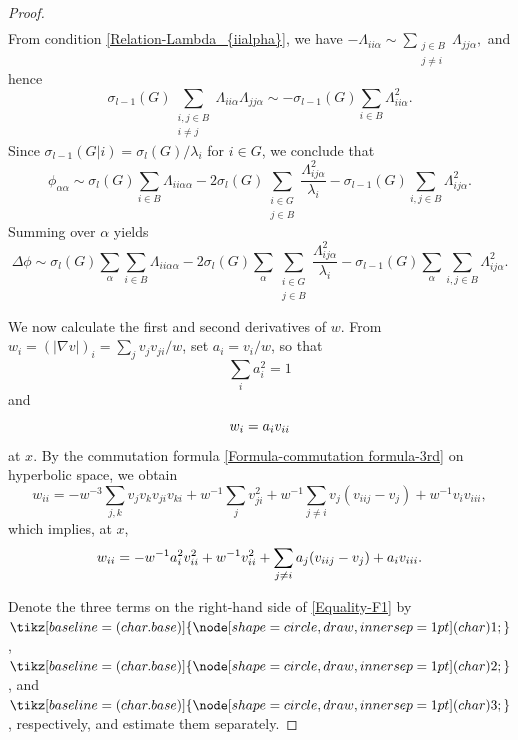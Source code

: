 \documentclass[11pt]{amsart}
\newcommand{\circled}[1]{
  \tikz[baseline=(char.base)]{
    \node[shape=circle,draw,inner sep=1pt] (char) {#1};
  }
}
\numberwithin{theorem}{section}
\numberwithin{equation}{section}
\begin{document}
\begin{proof}
\begin{align*}
\end{align*}
From condition \eqref{Relation-Lambda_{iialpha}}, we have $-\Lambda_{ii\alpha}\sim\sum_{\substack{j\in B\\ j\neq i}}\Lambda_{jj\alpha},$ and hence $$\sigma_{l-1}(G)\sum_{\substack{i,j\in B\\ i\neq j}}\Lambda_{ii\alpha}\Lambda_{jj\alpha}\sim-\sigma_{l-1}(G)\sum_{i\in B}\Lambda_{ii\alpha}^2.$$ Since $\sigma_{l-1}(G|i)=\sigma_l(G)/\lambda_i$ for $i\in G$, we conclude that $$\phi_{\alpha\alpha}\sim\sigma_l(G)\sum_{i\in B}\Lambda_{ii\alpha\alpha}-2\sigma_l(G)\sum_{\substack{i\in G\\ j\in B}}\frac{\Lambda_{ij\alpha}^2}{\lambda_i}-\sigma_{l-1}(G)\sum_{i,j\in B}\Lambda_{ij\alpha}^2.$$ Summing over $\alpha$ yields
\begin{equation}\label{Equality-F1}
\Delta\phi\sim\sigma_l(G)\sum_\alpha\sum_{i\in B}\Lambda_{ii\alpha\alpha}-2\sigma_l(G)\sum_\alpha\sum_{\substack{i\in G\\ j\in B}}\frac{\Lambda_{ij\alpha}^2}{\lambda_i}-\sigma_{l-1}(G)\sum_\alpha\sum_{i,j\in B}\Lambda_{ij\alpha}^2.
\end{equation}

We now calculate the first and second derivatives of $w$. From $w_i=(|\nabla v|)_i=\sum_jv_jv_{ji}/w$, set $a_i=v_i/w$, so that
\begin{equation}\label{Relation-a_i}
\sum_i a_i^2=1
\end{equation}
and
\begin{equation}\label{Relation-w_i=a_iv_{ii}}
w_i=a_iv_{ii}
\end{equation}
at $x$. By the commutation formula \eqref{Formula-commutation formula-3rd} on hyperbolic space, we obtain $$w_{ii}=-w^{-3}\sum_{j,k}v_jv_kv_{ji}v_{ki}+w^{-1}\sum_jv_{ji}^2+w^{-1}\sum_{j\neq i}v_j(v_{iij}-v_j)+w^{-1}v_iv_{iii},$$ which implies, at $x$,
\begin{equation}\label{Equality-w_{ii}}
w_{ii}=-w^{-1}a_i^2v_{ii}^2+w^{-1}v_{ii}^2+\sum_{j\neq i}a_j(v_{iij}-v_j)+a_iv_{iii}.
\end{equation}

Denote the three terms on the right-hand side of \eqref{Equality-F1} by $\circled{1}$, $\circled{2}$, and $\circled{3}$, respectively, and estimate them separately.


\end{proof}
\end{document}
